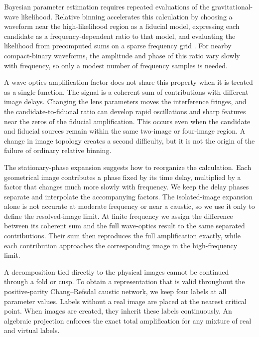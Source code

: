 \documentclass[aps,prd,twocolumn,nofootinbib,superscriptaddress,floatfix]{revtex4-2}
\begin{document}
Bayesian parameter estimation requires repeated evaluations of the
gravitational-wave likelihood.  Relative binning accelerates this calculation
by choosing a waveform near the high-likelihood region as a fiducial model,
expressing each candidate as a frequency-dependent ratio to that model, and
evaluating the likelihood from precomputed sums on a sparse frequency grid
\cite{ZackayDaiVenumadhav2018,DaiVenumadhavZackay2018,KrishnaEtAl2023,NarolaEtAl2024}.
For nearby compact-binary waveforms, the amplitude and phase of this ratio vary
slowly with frequency, so only a modest number of frequency samples is needed.

A wave-optics amplification factor does not share this property when it is
treated as a single function.  The signal is a coherent sum of contributions
with different image delays.  Changing the lens parameters moves the
interference fringes, and the candidate-to-fiducial ratio can develop rapid
oscillations and sharp features near the zeros of the fiducial amplification.
This occurs even when the candidate and fiducial sources remain within the
same two-image or four-image region.  A change in image topology creates a
second difficulty, but it is not the origin of the failure of ordinary
relative binning.

The stationary-phase expansion suggests how to reorganize the calculation.
Each geometrical image contributes a phase fixed by its time delay, multiplied
by a factor that changes much more slowly with frequency.  We keep the delay
phases separate and interpolate the accompanying factors.  The isolated-image
expansion alone is not accurate at moderate frequency or near a caustic, so we
use it only to define the resolved-image limit.  At finite frequency we assign
the difference between its coherent sum and the full wave-optics result to the
same separated contributions.  Their sum then reproduces the full
amplification exactly, while each contribution approaches the corresponding
image in the high-frequency limit.

A decomposition tied directly to the physical images cannot be continued
through a fold or cusp.  To obtain a representation that is valid throughout
the positive-parity Chang--Refsdal caustic network, we keep four labels at all
parameter values.  Labels without a real image are placed at the nearest
critical point.  When images are created, they inherit these labels
continuously.  An algebraic projection enforces the exact total amplification
for any mixture of real and virtual labels.
\end{document}
